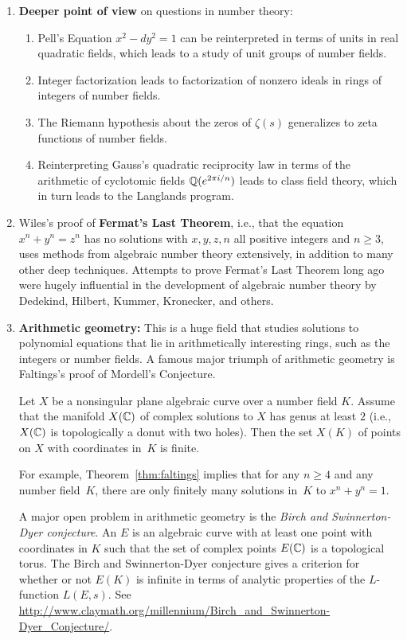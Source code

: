 \begin{enumerate}
\item {\bf Deeper point of view} on questions in number theory:
\begin{enumerate}
\item Pell's Equation $x^2-dy^2=1$ can be reinterpreted in terms of units in real quadratic fields, which
leads to a study of unit groups of number fields.
\item Integer factorization leads to factorization of nonzero ideals in rings of integers of number fields.
\item The Riemann hypothesis about the zeros of $\zeta(s)$ generalizes to zeta functions of number fields.
\item Reinterpreting Gauss's quadratic reciprocity law in terms of the
  arithmetic of cyclotomic fields $\mathbb{Q}(e^{2\pi i/n})$ leads to class
  field theory, which in turn leads to the Langlands program.
\end{enumerate}
\item Wiles's proof of {\bf Fermat's Last Theorem}, i.e., that the
equation $x^n+y^n=z^n$ has no solutions with $x,y,z,n$ all positive
integers and $n\geq 3$, uses methods from
algebraic number theory extensively, in addition to many other deep
techniques.  Attempts to prove Fermat's Last Theorem long ago were
hugely influential in the development of algebraic number theory
by Dedekind, Hilbert, Kummer, Kronecker, and others.
\item {\bf Arithmetic geometry:} This is a huge field that studies
solutions to polynomial equations that lie in arithmetically
interesting rings, such as the integers or number fields.  A famous
major triumph of arithmetic geometry is Faltings's proof of Mordell's
Conjecture.
\begin{theorem}[Faltings] \label{thm:faltings}
Let $X$ be a nonsingular plane algebraic curve over a number
field $K$.  Assume that the manifold $X(\mathbb{C})$ of complex solutions to
$X$ has genus at least $2$ (i.e., $X(\mathbb{C})$ is topologically a donut
with two holes).  Then the set $X(K)$ of points on $X$ with
coordinates in~$K$ is finite.
\end{theorem}  
For example, Theorem~\ref{thm:faltings} implies that for any $n\geq 4$
and any number field~$K$, there are only finitely many solutions
in~$K$ to $x^n+y^n=1$.  

A major open problem in arithmetic geometry is the {\em Birch
  and Swinnerton-Dyer conjecture}. 
An  $E$ is an algebraic curve with at least one point
with coordinates in $K$ such that the set of complex points
$E(\mathbb{C})$ is a topological torus.
The Birch and Swinnerton-Dyer conjecture gives a
criterion for whether or not $E(K)$ is infinite in
terms of analytic properties of the $L$-function $L(E,s)$.
See \url{http://www.claymath.org/millennium/Birch_and_Swinnerton-Dyer_Conjecture/}.

\end{enumerate}


